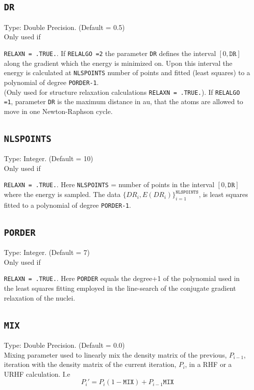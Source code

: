 \documentclass[a4paper,twoside,openany]{book}
\begin{document}
{\subsection{\texttt{DR}}
Type: Double Precision. (Default = 0.5)\\
Only used if {\texttt{RELAXN = .TRUE.}. If \texttt{RELALGO =2} the parameter \texttt{DR} defines the interval $[0,\texttt{DR}]$ along the gradient which the energy is minimized on. Upon this interval the energy 
is calculated at \texttt{NLSPOINTS} number of points and fitted (least squares) to a polynomial of degree \texttt{PORDER-1}.\\
(Only used for structure relaxation calculations \texttt{RELAXN = .TRUE.}). If \texttt{RELALGO =1}, parameter \texttt{DR} is the maximum  distance in au, that the atoms 
are allowed to move in one Newton-Raphson cycle.

\subsection{\texttt{NLSPOINTS}}
Type:  Integer. (Default = 10)\\
Only used if {\texttt{RELAXN = .TRUE.}. Here \texttt{NLSPOINTS}  = number of points in the interval $[0,\texttt{DR}]$ where the energy is sampled. The data $\{DR_{i},E(DR_{i})\}_{i=1}^{\texttt{NLSPOINTS}}$,
is least squares fitted to a polynomial of degree \texttt{PORDER-1}.

\subsection{\texttt{PORDER}}
Type:  Integer. (Default = 7)\\
Only used if {\texttt{RELAXN = .TRUE.}. Here \texttt{PORDER} equals the degree+1 of the polynomial used in the least squares fitting employed in the line-search of the conjugate gradient relaxation of the nuclei.

\subsection{\texttt{MIX}}
Type: Double Precision. (Default = 0.0)\\
Mixing parameter used to linearly mix the density matrix of the previous, $P_{i-1}$, iteration with the density matrix of the current iteration, $P_{i}$, in 
a RHF or a URHF calculation. I.e 
\begin{equation}
P_{i}' = P_{i}(1-\texttt{MIX}) + P_{i-1}\texttt{MIX}
\end{equation}

}}}}
\end{document}
